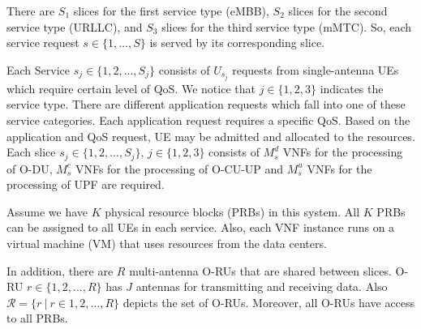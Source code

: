 \documentclass[conference]{IEEEtran}
\begin{document}
 There are $S_1$ slices for the first service type (eMBB), $S_2$ slices for the second service type (URLLC), and $S_3$ slices for the third service type (mMTC). So, each service request $s\in \{1,\ldots,S\}$ is served by its corresponding slice.

Each Service $s_j\in \{1,2,...,S_j\} $ consists of $U_{s_j}$ requests from  single-antenna UEs which require certain level of QoS. We notice that $j \in \{1,2,3\}$ indicates the service type.
There are different application requests which fall into one of these service categories. Each application request requires a specific QoS. Based on the application and QoS request, UE may be admitted and allocated to the resources.
Each slice $s_j \in \{1,2,...,S_j \}$, $j \in \{1,2,3\}$ consists of  $M_s^{d}$ VNFs for the processing of O-DU, $M_s^{c}$ VNFs for the processing of O-CU-UP and $M_s^{u}$ VNFs for the processing of UPF are required.

Assume we have $K$ physical resource blocks (PRBs) in this system.
All $K$ PRBs can be assigned to all UEs in each service.
Also, each VNF instance runs on a virtual machine (VM) that uses resources from the data centers.

In addition, there are $R$ multi-antenna O-RUs that are shared between slices. O-RU $r \in \{1,2,...,R \}$ has $J$ antennas for transmitting and receiving data. Also $\mathcal{R} = \{ r \ | \ r\in 1,2,...,R \}$ depicts the set of O-RUs. Moreover, all O-RUs have access to all PRBs.

\end{document}
